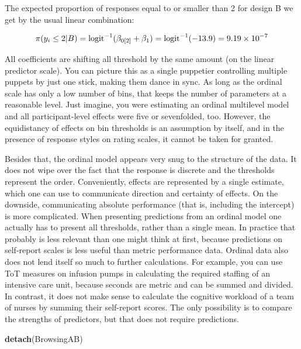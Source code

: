 \documentclass[]{svmono}
\newenvironment{Shaded}{\begin{snugshade}}{\end{snugshade}}
\newcommand{\KeywordTok}[1]{\textcolor[rgb]{0.13,0.29,0.53}{\textbf{#1}}}
\newcommand{\NormalTok}[1]{#1}
\theoremstyle{definition}
\theoremstyle{definition}
\theoremstyle{definition}
\theoremstyle{remark}
\begin{document}
The expected proportion of responses equal to or smaller than 2 for
design B we get by the usual linear combination:

\[
\pi(y_i \leq 2|B) = \\
\text{logit}^{-1}(\beta_{0[2]} + \beta_1) = \\ 
\text{logit}^{-1}(-13.9) = \\
9.19\times 10^{-7}
\]

All coefficients are shifting all threshold by the same amount (on the
linear predictor scale). You can picture this as a single puppetier
controlling multiple puppets by just one stick, making them dance in
sync. As long as the ordinal scale has only a low number of bins, that
keeps the number of parameters at a reasonable level. Just imagine, you
were estimating an ordinal multilevel model and all participant-level
effects were five or sevenfolded, too. However, the equidistancy of
effects on bin thresholds is an assumption by itself, and in the
presence of response styles on rating scales, it cannot be taken for
granted.

Besides that, the ordinal model appears very snug to the structure of
the data. It does not wipe over the fact that the response is discrete
and the thresholds represent the order. Conveniently, effects are
represented by a single estimate, which one can use to communicate
direction and certainty of effects. On the downside, communicating
absolute performance (that is, including the intercept) is more
complicated. When presenting predictions from an ordinal model one
actually has to present all thresholds, rather than a single mean. In
practice that probably is less relevant than one might think at first,
because predictions on self-report scales is less useful than metric
performance data. Ordinal data also does not lend itself so much to
further calculations. For example, you can use ToT measures on infusion
pumps in calculating the required staffing of an intensive care unit,
because seconds are metric and can be summed and divided. In contrast,
it does not make sense to calculate the cognitive workload of a team of
nurses by summing their self-report scores. The only possibility is to
compare the strengths of predictors, but that does not require
predictions.

\begin{Shaded}
\begin{Highlighting}[]
\KeywordTok{detach}\NormalTok{(BrowsingAB)}
\end{Highlighting}
\end{Shaded}
\end{document}
